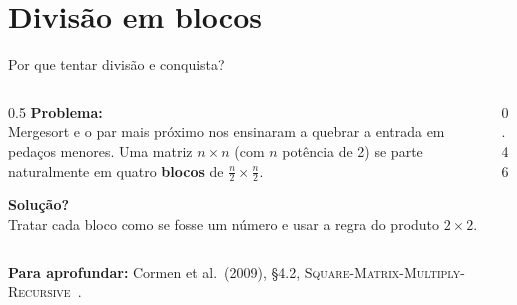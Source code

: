 \documentclass[aspectratio=169,xcolor=table]{beamer}
\newcommand{\blocos}[3]{%
  \matrix[matrix of math nodes, nodes={#1}, column sep=-\pgflinewidth,
          row sep=-\pgflinewidth, ampersand replacement=\&] (#2) {%
    #3_{11} \& #3_{12} \\ #3_{21} \& #3_{22} \\};%
}
\newcommand{\fonte}[1]{%
  \vfill
  {\tiny\color{gray!55!black}\textbf{Para aprofundar:} #1\par}%
}
\begin{document}
\section{Divisão em blocos}

\begin{frame}{Por que tentar divisão e conquista?}
  \begin{columns}[c]
    \begin{column}{0.5\textwidth}
      \textbf{Problema:}\\
      \scriptsize Mergesort e o par mais próximo nos ensinaram a quebrar a entrada em
      pedaços menores. Uma matriz $n\times n$ (com $n$ potência de 2) se parte
      naturalmente em quatro \textbf{blocos} de $\frac n2\times\frac n2$.
      \medskip

      \textbf{Solução?}\\
      \scriptsize Tratar cada bloco como se fosse um número e usar a regra do
      produto $2\times 2$.
    \end{column}
    \begin{column}{0.46\textwidth}
      \centering
    \end{column}
  \end{columns}
  \fonte{Cormen et al.\ (2009), \S 4.2, \textsc{Square-Matrix-Multiply-Recursive}~\cite{cormen2009introduction}.}
\end{frame}
\end{document}
